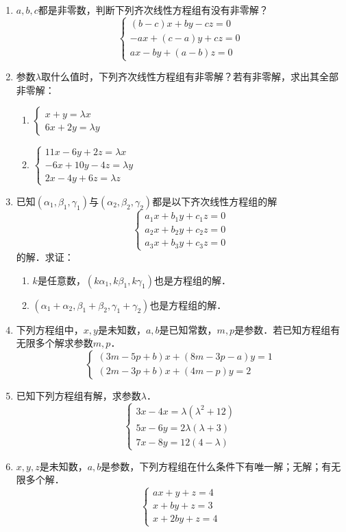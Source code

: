 \begin{enumerate}
\item $a,b,c$都是非零数，判断下列齐次线性方程组有没有非零解？
\[\begin{cases}
    (b-c)x+by-cz=0\\
    -ax+(c-a)y+cz=0\\
    ax-by+(a-b)z=0
\end{cases}\]

\item 参数$\lambda$取什么值时，下列齐次线性方程组有非零解？若有非零解，求出其全部非零解：
\begin{multicols}{2}
\begin{enumerate}
    \item $\begin{cases}
        x+y=\lambda  x\\
        6x+2y=\lambda  y
    \end{cases}$
    \item $\begin{cases}
        11x-6y+2z=\lambda x\\
-6x+10y-4z=\lambda  y\\
2x-4y+6z=\lambda z
    \end{cases}$
\end{enumerate}
\end{multicols}

\item 已知$(\alpha_1,\beta_1,\gamma_1)$与$(\alpha_2,\beta_2,\gamma_2)$都是以下齐次线性方程组的解
\[\begin{cases}
    a_1x+b_1y+c_1z=0\\
    a_2x+b_2y+c_2z=0\\
    a_3x+b_3y+c_3z=0
\end{cases}\]
的解．求证：
\begin{enumerate}
    \item $k$是任意数，$(k\alpha_1,k\beta_1,k\gamma_1)$也是方程组的解．
    \item $(\alpha_1+\alpha_2,\beta_1+\beta_2,\gamma_1+\gamma_2)$也是方程组的解．
\end{enumerate}

\item 下列方程组中，$x,y$是未知数，$a,b$是已知常数，$m,p$是参数．若已知方程组有无限多个解求参数$m,p$．
\[\begin{cases}
    (3m-5p+b) x+ (8m-3p-a) y=1\\
    (2m-3p+b) x+ (4m-p) y=2
\end{cases}\]

\item 已知下列方程组有解，求参数$\lambda$．
\[\begin{cases}
    3x-4x=\lambda   (\lambda^2+12)\\
    5x-6y=2\lambda   (\lambda  +3)\\
    7x-8y=12 (4-\lambda  )
\end{cases}\]
\item $x,y,z$是未知数，$a,b$是参数，下列方程组在什么条件下有唯一解；无解；有无限多个解．
\[\begin{cases}
    ax+y+z=4\\
    x+by+z=3\\
    x+2by+z=4
\end{cases}\]


\end{enumerate}
